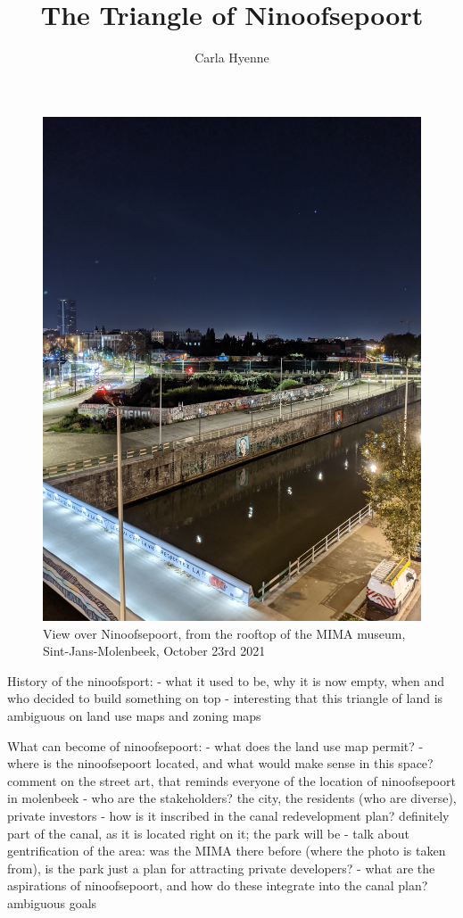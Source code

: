 \documentclass{article}[11pt]
\title{The Triangle of Ninoofsepoort}
\author{Carla Hyenne}
\begin{document}
\maketitle

\begin{figure}[h!]
	\centering
	\captionsetup{labelformat=empty}
	\includegraphics[width=\textwidth, angle=-90]{bxl_canal_far}
	\caption{View over Ninoofsepoort, from the rooftop of the MIMA museum, Sint-Jans-Molenbeek, October 23rd 2021}
\end{figure}

\pagebreak

History of the ninoofsport: 
- what it used to be, why it is now empty, when and who decided to build something on top
- interesting that this triangle of land is ambiguous on land use maps and zoning maps

What can become of ninoofsepoort:
- what does the land use map permit?
- where is the ninoofsepoort located, and what would make sense in this space? comment on the street art, that reminds everyone of the location of ninoofsepoort in molenbeek
- who are the stakeholders? the city, the residents (who are diverse), private investors
- how is it inscribed in the canal redevelopment plan? definitely part of the canal, as it is located right on it; the park will be 
- talk about gentrification of the area: was the MIMA there before (where the photo is taken from), is the park just a plan for attracting private developers?
- what are the aspirations of ninoofsepoort, and how do these integrate into the canal plan? ambiguous goals
\end{document}
